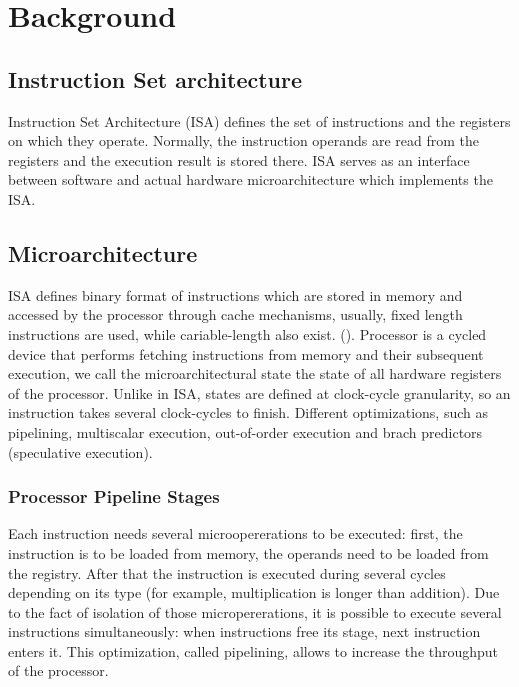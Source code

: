 \chapter{Background}

\section{Instruction Set architecture}

Instruction Set Architecture (ISA) defines the set of instructions and the registers on which they operate. Normally, the instruction operands are read from the registers and the execution result is stored there. ISA serves as an interface between software and actual hardware microarchitecture which implements the ISA. 

\section{Microarchitecture}

ISA defines binary format of instructions which are stored in memory and accessed by the processor through cache mechanisms, usually, fixed length instructions are used, while cariable-length also exist. (). Processor is a cycled device that performs fetching instructions from memory and their subsequent execution, we call the microarchitectural state the state of all hardware registers of the processor. Unlike in ISA, states are defined at clock-cycle granularity, so an instruction takes several clock-cycles to finish. Different optimizations, such as pipelining, multiscalar execution, out-of-order execution and brach predictors (speculative execution).

\subsection{Processor Pipeline Stages}

Each instruction needs several microopererations to be executed: first, the instruction is to be loaded from memory, the operands need to be loaded from the registry. After that the instruction is executed during several cycles depending on its type (for example, multiplication is longer than addition). Due to the fact of isolation of those micropererations, it is possible to execute several instructions simultaneously: when instructions free its stage, next instruction enters it. This optimization, called pipelining, allows to increase the throughput of the processor.


